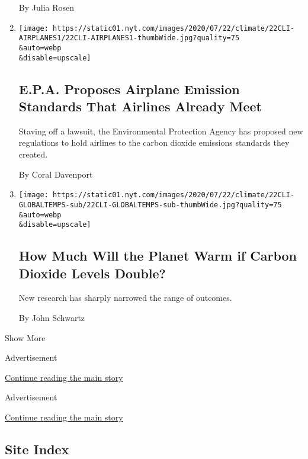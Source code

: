 \begin{enumerate}
  By Julia Rosen
\item
  \href{/2020/07/22/climate/airplanes-climate-change.html}{}

  \texttt{[image: https://static01.nyt.com/images/2020/07/22/climate/22CLI-AIRPLANES1/22CLI-AIRPLANES1-thumbWide.jpg?quality=75\\\&auto=webp\\\&disable=upscale]}

  \hypertarget{epa-proposes-airplane-emission-standards-that-airlines-already-meet}{%
  \subsection{E.P.A. Proposes Airplane Emission Standards That Airlines
  Already
  Meet}\label{epa-proposes-airplane-emission-standards-that-airlines-already-meet}}

  Staving off a lawsuit, the Environmental Protection Agency has
  proposed new regulations to hold airlines to the carbon dioxide
  emissions standards they created.

  By Coral Davenport
\item
  \href{/2020/07/22/climate/global-warming-temperature-range.html}{}

  \texttt{[image: https://static01.nyt.com/images/2020/07/22/climate/22CLI-GLOBALTEMPS-sub/22CLI-GLOBALTEMPS-sub-thumbWide.jpg?quality=75\\\&auto=webp\\\&disable=upscale]}

  \hypertarget{how-much-will-the-planet-warm-if-carbon-dioxide-levels-double}{%
  \subsection{How Much Will the Planet Warm if Carbon Dioxide Levels
  Double?}\label{how-much-will-the-planet-warm-if-carbon-dioxide-levels-double}}

  New research has sharply narrowed the range of outcomes.

  By John Schwartz
\end{enumerate}

Show More

Advertisement

\protect\hyperlink{after-mid1}{Continue reading the main story}

Advertisement

\protect\hyperlink{after-mktg}{Continue reading the main story}

\hypertarget{site-index}{%
\subsection{Site Index}\label{site-index}}

